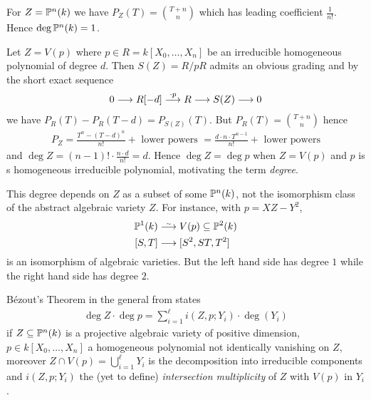 \documentclass[a4paper,parskip=half,numbers=enddot, DIV=12, headheight=30pt]{scrreprt}
\begin{document}
\begin{example}
    \begin{alphanumerate}
      \item 
        For $Z=\mathbb{P}^n(k)$ we have $P_Z(T) = \binom{T+n}n$ which has leading coefficient $\frac{1}{n!}$. Hence $\deg \mathbb{P}^n(k) = 1$.
    \item 
        Let $Z= V(p)$ where $p\in R = k[X_0,\ldots, X_n]$ be an irreducible homogeneous polynomial of degree $d$. Then $S(Z) = R/pR$ admits an obvious grading and by the short exact sequence
        \begin{align*}
            0\morphism R[-d]\morphism[\cdot p] R\morphism S (Z) \morphism 0
        \end{align*}
        we have $P_R(T) - P_R(T-d) = P_{S(Z)}(T)$. But $P_R(T) = \binom{T+n}n$ hence 
        \begin{align*}
        	P_Z = \frac{T^n-(T-d)^n}{n!} + \text{ lower powers } = \frac{d\cdot n\cdot T^{n-1}}{n!} + \text{ lower powers} 
        \end{align*}
        and $\deg Z = (n-1)! \cdot\frac{n\cdot d}{n!} = d$. Hence $\deg Z = \deg p$ when $Z=V(p)$ and $p$ is s homogeneous irreducible polynomial, motivating the term \emph{degree}.
    \end{alphanumerate}
\end{example}
\begin{rem*}
    This degree depends on $Z$ as a subset of some $\mathbb{P}^n(k)$, not the isomorphism class of the abstract algebraic variety $Z$. For instance, with $p= XZ-Y^2$,
    \begin{align*}
        \IP^1(k) &\isomorphism  V(p) \subseteq \IP^2(k)\\
        [S,T] &\morphism[] [S^2, ST, T^2]
    \end{align*}
    is an isomorphism of algebraic varieties. But the left hand side has degree $1$ while the right hand side has degree $2$.
\end{rem*}
\begin{rem*}
    B\'ezout's Theorem in the general from states 
    \begin{align*}
    	\deg Z\cdot \deg p = \sum_{i=1}^\ell i(Z,p; Y_i) \cdot \deg(Y_i)
    \end{align*}
     if $Z\subseteq \mathbb{P}^n(k)$ is a projective algebraic variety of positive dimension, $p\in k[X_0,\ldots, X_n]$ a homogeneous polynomial not identically vanishing on $Z$, moreover $Z\cap V(p) = \bigcup_{i=1}^\ell Y_i$ is the decomposition into irreducible components and $i(Z,p;Y_i)$ the (yet to define) \emph{intersection multiplicity} of $Z$ with $V(p)$ in $Y_i$.
\end{rem*}
\end{document}
